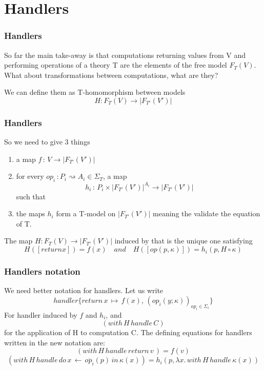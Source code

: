 \documentclass{beamer}
\begin{document}
    
    
        

\section{Handlers}

\begin{frame}
    \frametitle{Handlers}
    So far the main take-away is that computations returning values from V and performing
operations of a theory T are the elements of the free model $F_T(V)$. What about transformations between computations, what are they?
    
We can define them as T-homomorphism between models 
\[
  H : F_T(V) \rightarrow |F_{T'}(V')|
\]


    

\end{frame}
\begin{frame}
    \frametitle{Handlers}
    So we need to give 3 things 
\begin{enumerate}
    \item a map $f \, : \, V \rightarrow |F_{T'}(V')|$
    \item for every $op_i \, : P_i \rightsquigarrow A_i \in \Sigma_T$, a map 
    \[
        h_i \, : \, P_i \times |F_{T'}(V')|^{A_i} \rightarrow |F_{T'}(V')|
    \]
    such that
    \item  the maps $h_i$ form a T-model on $|F_{T'}(V')|$ meaning the validate the equation of T.
\end{enumerate}
The map $H : F_T(V) \rightarrow |F_{T'}(V')|$ induced by that is the unique one satisfying 
\[
  H([return x]) = f(x) \quad and \quad H([op(p,\kappa)]) = h_i(p, H \circ \kappa)  
\]

\end{frame}

\begin{frame}
    \frametitle{Handlers notation}
    We need better notation for handlers. Let us write 
    \[
      handler \{  
        return \, x \, \mapsto \, f(x), \, (op_i(y; \kappa))_{op_i \in \Sigma_i}
      \}  
    \]
    For handler induced by $f$ and $h_i$, and 
    \[
      (with \, H \, handle \, C)  
    \] for the application of H to computation C.
    The defining equations for handlers written
in the new notation are:
\[
    (with \, H \, handle \, return \,  v \,) = f(v)  
\]
\[
  (with \, H \, handle \, do\,  x \, \leftarrow \, \overline{op_i}(p) \, in \, \kappa(x) )
  = h_i (p, \lambda x. \, with \, H \, handle \, \kappa(x))  
\]



    

\end{frame}
\end{document}
